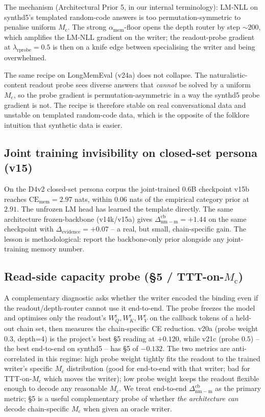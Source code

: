 \documentclass[11pt]{article}
\newcommand{\Mc}{M_{\mathrm{c}}}
\newcommand{\dnm}{\Delta_{\mathrm{nm{-}m}}}
\newcommand{\CEmem}{\mathrm{CE}_{\mathrm{mem}}}
\newcommand{\elift}{\Delta_{\mathrm{evidence}}}
\newcommand{\amem}{\alpha_{\mathrm{mem}}}
\begin{document}
The mechanism (Architectural Prior 5, in our internal terminology):
LM-NLL on synthd5's templated random-code answers is too
permutation-symmetric to penalise uniform $\Mc$. The strong
$\amem$-floor opens the depth router by step $\sim 200$, which
amplifies the LM-NLL gradient on the writer; the readout-probe
gradient at $\lambda_{\mathrm{rprobe}}=0.5$ is then on a knife edge
between specialising the writer and being overwhelmed.

The same recipe on LongMemEval (v24a) does not collapse. The
naturalistic-content readout probe sees diverse answers that
\emph{cannot} be solved by a uniform $\Mc$, so the probe gradient is
permutation-asymmetric in a way the synthd5 probe gradient is not.
The recipe is therefore stable on real conversational data and
unstable on templated random-code data, which is the opposite of the
folklore intuition that synthetic data is easier.

\subsection{Joint training invisibility on closed-set persona (v15)}

On the D4v2 closed-set persona corpus the joint-trained $0.6$B
checkpoint v15b reaches $\CEmem = 2.97$ nats, within $0.06$ nats of
the empirical category prior at $2.91$. The unfrozen LM head has
learned the template directly. The same architecture frozen-backbone
(v14k/v15a) gives $\dnm^{\mathrm{cb}} = +1.44$ on the same
checkpoint with $\elift = +0.07$ -- a real, but small,
chain-specific gain. The lesson is methodological: report the
backbone-only prior alongside any joint-training memory number.

\subsection{Read-side capacity probe (\texorpdfstring{\S5}{Sec.~5} / TTT-on-\texorpdfstring{$\Mc$}{Mc})}

A complementary diagnostic asks whether the writer encoded the
binding even if the readout/depth-router cannot use it end-to-end.
The probe freezes the model and optimises only the readout's
$W_Q^{\mathrm{r}}, W_K^{\mathrm{r}}, W_V^{\mathrm{r}}$ on the
callback tokens of a held-out chain set, then measures the
chain-specific CE reduction. v20a (probe weight $0.3$, depth=4)
is the project's best \S5 reading at $+0.120$, while v21c (probe
$0.5$) -- the best end-to-end on synthd5 -- has \S5 of $-0.132$.
The two metrics are anti-correlated in this regime: high probe
weight tightly fits the readout to the trained writer's specific
$\Mc$ distribution (good for end-to-end with that writer; bad for
TTT-on-$\Mc$ which moves the writer); low probe weight keeps the
readout flexible enough to decode any reasonable $\Mc$. We treat
end-to-end $\dnm^{\mathrm{cb}}$ as the primary metric; \S5 is a
useful complementary probe of whether \emph{the architecture can}
decode chain-specific $\Mc$ when given an oracle writer.
\end{document}
